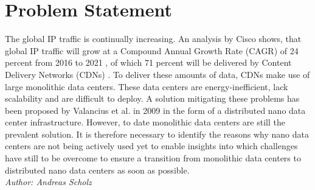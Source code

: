 \documentclass[sigchi-a, authorversion]{acmart}
\begin{document}

\maketitle

%  
%  
%  
%


\section{Problem Statement} %
The global IP traffic is continually increasing. An analysis by Cisco shows, that global IP traffic will grow at a Compound Annual Growth Rate (CAGR) of 24 percent from 2016 to 2021 \cite{TheZetta68:online}, of which 71 percent will be delivered by Content Delivery Networks (CDNs) \cite{TheZetta68:online}. To deliver these amounts of data, CDNs make use of large monolithic data centers. These data centers are energy-inefficient, lack scalability and are difficult to deploy. \cite{DBLP:conf/conext/ValanciusLMDR09} A solution mitigating these problems has been proposed by Valancius et al. in 2009 \cite{DBLP:conf/conext/ValanciusLMDR09} in the form of a distributed nano data center infrastructure. However, to date monolithic data centers are still the prevalent solution. It is therefore necessary to identify the reasons why nano data centers are not being actively used yet to enable insights into which challenges have still to be overcome to ensure a transition from monolithic data centers to distributed nano data centers as soon as possible.\\
\textit{Author: Andreas Scholz}\\
\end{document}
